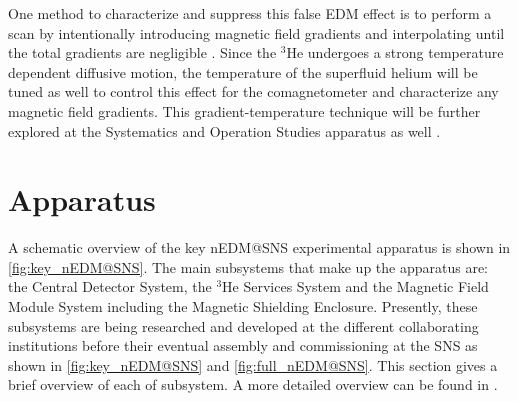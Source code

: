 One method to characterize and suppress this false EDM effect is to perform a scan by intentionally introducing magnetic field gradients and interpolating until the total gradients are negligible \cite{Pendlebury2015}. Since the $^3$He undergoes a strong temperature dependent diffusive motion, the temperature of the superfluid helium will be tuned as well to control this effect for the comagnetometer and characterize any magnetic field gradients. This gradient-temperature technique will be further explored at the Systematics and Operation Studies apparatus as well \cite{Ahmed2019, Swank2012, Swank2016}. 

\section{Apparatus}

A schematic overview of the key nEDM@SNS experimental apparatus is shown in \cref{fig:key_nEDM@SNS}. The main subsystems that make up the apparatus are: the Central Detector System, the $^3$He Services System and the Magnetic Field Module System including the Magnetic Shielding Enclosure. Presently, these subsystems are being researched and developed at the different collaborating institutions before their eventual assembly and commissioning at the SNS as shown in \cref{fig:key_nEDM@SNS} and \cref{fig:full_nEDM@SNS}. This section gives a brief overview of each of subsystem. A more detailed overview can be found in \cite{Ahmed2019}.


